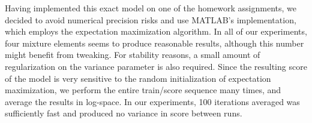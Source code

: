 Having implemented this exact model on one of the homework assignments, we decided to avoid numerical precision risks and use MATLAB's implementation, which employs the expectation maximization algorithm.  In all of our experiments, four mixture elements seems to produce reasonable results, although this number might benefit from tweaking.  For stability reasons, a small amount of regularization on the variance parameter is also required.   Since the resulting score of the model is very sensitive to the random initialization of expectation maximization, we perform the entire train/score sequence many times, and average the results in log-space.  In our experiments, 100 iterations averaged was sufficiently fast and produced no variance in score between runs.